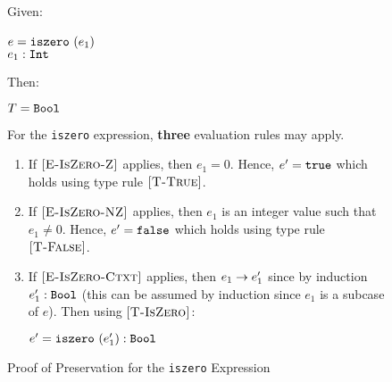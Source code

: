 \documentclass{report}
\newcommand{\rel}[1]{\mbox{\sc [#1]}}
\begin{document}
\begin{figure}[ht!]
Given:
\begin{center}
   $e = \mbox{\tt iszero}~(e_1)$~\\
   ${e_1} : {\mbox{\tt Int}}$
\end{center}
Then:
\begin{center}
   $T = \mbox{\tt Bool}$
\end{center}
For the \texttt{iszero} expression, \textbf{three} evaluation rules may apply.
\begin{enumerate}

    \item If $\rel{E-IsZero-Z}$ applies, then $e_1 = 0$.  Hence, $e' = \mbox{\tt true}$ which holds using type rule $\rel{T-True}$.
      
    \item If $\rel{E-IsZero-NZ}$ applies, then $e_1$ is an integer value such that $e_1 \ne 0$.  Hence, $e' = \mbox{\tt false}$ which holds using type rule $\rel{T-False}$.
    
    \item If $\rel{E-IsZero-Ctxt}$ applies, then ${e_1} \rightarrow {e'_1}$ since by induction ${e'_1} : {\mbox{\tt Bool}}$ (this can be assumed by induction since $e_1$ is a subcase of $e$).  Then using $\rel{T-IsZero}$:
    
    \begin{center}
      ${e' = \mbox{\tt iszero}~(e'_1)} : {\mbox{\tt Bool}}$
    \end{center}
    
\end{enumerate}

  \caption{Proof of Preservation for the \texttt{iszero} Expression}\label{fig:isZeroProofPreservation}
\end{figure} 
\end{document}
